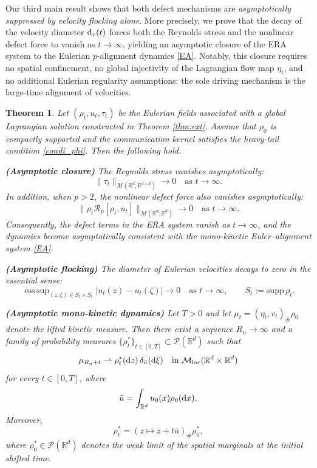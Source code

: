 \documentclass[10pt,reqno]{amsart}
\DeclareMathOperator*{\esssup}{ess\,sup}
\numberwithin{equation}{section}
\newtheorem{theorem}{Theorem}[section]
\newcommand{\R}{\mathbb R}
\newcommand{\intr}{\int_{\R^d}}
\newcommand{\calM}{\mathcal M}
\newcommand{\calP}{\mathcal P}
\newcommand{\calR}{\mathcal R}
\newcommand{\rd}{\textnormal{d}}
\begin{document}
Our third main result shows that both defect mechanisms are \emph{asymptotically suppressed by velocity flocking alone}. More precisely, we prove that the decay of the velocity diameter $\rd_v(t)$ forces both the Reynolds stress and the nonlinear defect force to vanish as $t\to\infty$, yielding an asymptotic closure of the ERA system to the Eulerian $p$-alignment dynamics \eqref{EA}. Notably, this closure requires no spatial confinement, no global injectivity of the Lagrangian flow map $\eta_t$, and no additional Eulerian regularity assumptions: the sole driving mechanism is the large-time alignment of velocities.

 
 
\begin{theorem} \label{thm:asymp_closure}
Let $(\rho_t,u_t,\tau_t)$ be the Eulerian fields associated with a global  Lagrangian solution constructed in Theorem \ref{thm:ext}.  Assume that $\rho_0$ is compactly supported and the communication kernel satisfies the heavy-tail condition \eqref{condi_phi}. Then the following hold.

\medskip
\noindent
\textbf{(Asymptotic closure)} The Reynolds stress vanishes asymptotically:
\[
\|\tau_t\|_{\calM(\R^d;\R^{d\times d})}\to0 \quad\text{as }t\to\infty.
\]
In addition, when $p>2$, the nonlinear defect force also vanishes asymptotically:
\[
\|\rho_t \calR_p[\rho_t,u_t]\|_{\calM(\R^d;\R^d)}\to0 \quad\text{as }t\to\infty.
\]
Consequently, the defect terms in the ERA system vanish as $t\to\infty$, and the dynamics become asymptotically consistent with the mono-kinetic Euler--alignment system \eqref{EA}.


\medskip
\noindent
\textbf{(Asymptotic flocking)} The diameter of Eulerian velocities decays to zero in the essential sense:
\[
\esssup_{(z,\zeta)\in S_t\times S_t}|u_t(z)-u_t(\zeta)|
\to 0 \quad \text{as }t\to\infty, \qquad S_t :=\text{supp}\,\rho_t.
\]



\medskip
\noindent
\textbf{(Asymptotic mono-kinetic dynamics)}
Let $T>0$ and let $\mu_t=(\eta_t,v_t)_\#\rho_0$ denote the lifted kinetic measure. Then there exist a sequence $R_n\to\infty$ and a family of probability measures $\{\rho_t^\ast\}_{t\in[0,T]}\subset\calP(\R^d)$ such that
\[
\mu_{R_n+t} \rightharpoonup \rho_t^\ast(\rd z)\,\delta_{\bar u}(\rd\xi) \quad
\text{in }\calM_{\mathrm{loc}}(\R^d\times\R^d)
\]
for every $t\in[0,T]$, where
\[
\bar u=\intr u_0(x)\rho_0(\rd x).
\]
Moreover,
\[
\rho_t^\ast=(z\mapsto z+t\bar u)_\#\rho_0^\ast,
\]
where $\rho_0^\ast\in\mathcal P(\R^d)$ denotes the weak limit of the spatial marginals at the initial shifted time.
\end{theorem}
 
\end{document}
